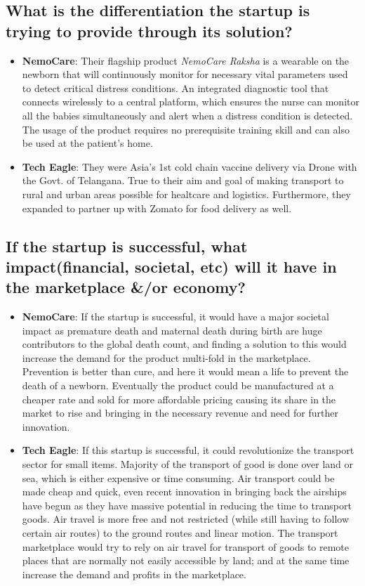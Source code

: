 \documentclass[a4paper]{article}
\begin{document}
\subsection{What is the differentiation the startup is trying to provide through its solution?}

\large{
\begin{itemize}
    \item \textbf{NemoCare}: Their flagship product \textit{NemoCare Raksha} is a wearable on the newborn that will continuously monitor for necessary vital parameters used to detect critical distress conditions. An integrated diagnostic tool that connects wirelessly to a central platform, which ensures the nurse can monitor all the babies simultaneously and alert when a distress condition is detected. The usage of the product requires no prerequisite training skill and can also be used at the patient's home.
    \item \textbf{Tech Eagle}: They were Asia's 1st cold chain vaccine delivery via Drone with the Govt. of Telangana. True to their aim and goal of making transport to rural and urban areas possible for healtcare and logistics. Furthermore, they expanded to partner up with Zomato for food delivery as well.
\end{itemize}
}

\subsection{If the startup is successful, what impact(financial, societal, etc) will it have in the marketplace \&/or economy?}

\large{
\begin{itemize}
    \item \textbf{NemoCare}: If the startup is successful, it would have a major societal impact as premature death and maternal death during birth are huge contributors to the global death count, and finding a solution to this would increase the demand for the product multi-fold in the marketplace. Prevention is better than cure, and here it would mean a life to prevent the death of a newborn. Eventually the product could be manufactured at a cheaper rate and sold for more affordable pricing causing its share in the market to rise and bringing in the necessary revenue and need for further innovation.
    \item \textbf{Tech Eagle}: If this startup is successful, it could revolutionize the transport sector for small items. Majority of the transport of good is done over land or sea, which is either expensive or time consuming. Air transport could be made cheap and quick, even recent innovation in bringing back the airships have begun as they have massive potential in reducing the time to transport goods. Air travel is more free and not restricted (while still having to follow certain air routes) to the ground routes and linear motion. The transport marketplace would try to rely on air travel for transport of goods to remote places that are normally not easily accessible by land; and at the same time increase the demand and profits in the marketplace.
\end{itemize}
}
\end{document}
